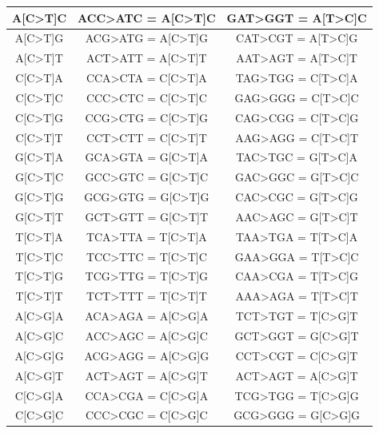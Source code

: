 \begin{longtable}{c|c|c}
\ttfamily A[C>T]C & \ttfamily ACC>ATC = A[C>T]C & \ttfamily GAT>GGT = A[T>C]C \\ \hline
\ttfamily A[C>T]G & \ttfamily ACG>ATG = A[C>T]G & \ttfamily CAT>CGT = A[T>C]G \\ \hline
\ttfamily A[C>T]T & \ttfamily ACT>ATT = A[C>T]T & \ttfamily AAT>AGT = A[T>C]T \\ \hline
\ttfamily C[C>T]A & \ttfamily CCA>CTA = C[C>T]A & \ttfamily TAG>TGG = C[T>C]A \\ \hline
\ttfamily C[C>T]C & \ttfamily CCC>CTC = C[C>T]C & \ttfamily GAG>GGG = C[T>C]C \\ \hline
\ttfamily C[C>T]G & \ttfamily CCG>CTG = C[C>T]G & \ttfamily CAG>CGG = C[T>C]G \\ \hline
\ttfamily C[C>T]T & \ttfamily CCT>CTT = C[C>T]T & \ttfamily AAG>AGG = C[T>C]T \\ \hline
\ttfamily G[C>T]A & \ttfamily GCA>GTA = G[C>T]A & \ttfamily TAC>TGC = G[T>C]A \\ \hline
\ttfamily G[C>T]C & \ttfamily GCC>GTC = G[C>T]C & \ttfamily GAC>GGC = G[T>C]C \\ \hline
\ttfamily G[C>T]G & \ttfamily GCG>GTG = G[C>T]G & \ttfamily CAC>CGC = G[T>C]G \\ \hline
\ttfamily G[C>T]T & \ttfamily GCT>GTT = G[C>T]T & \ttfamily AAC>AGC = G[T>C]T \\ \hline
\ttfamily T[C>T]A & \ttfamily TCA>TTA = T[C>T]A & \ttfamily TAA>TGA = T[T>C]A \\ \hline
\ttfamily T[C>T]C & \ttfamily TCC>TTC = T[C>T]C & \ttfamily GAA>GGA = T[T>C]C \\ \hline
\ttfamily T[C>T]G & \ttfamily TCG>TTG = T[C>T]G & \ttfamily CAA>CGA = T[T>C]G \\ \hline
\ttfamily T[C>T]T & \ttfamily TCT>TTT = T[C>T]T & \ttfamily AAA>AGA = T[T>C]T \\ \hline
\ttfamily A[C>G]A & \ttfamily ACA>AGA = A[C>G]A & \ttfamily TCT>TGT = T[C>G]T \\ \hline
\ttfamily A[C>G]C & \ttfamily ACC>AGC = A[C>G]C & \ttfamily GCT>GGT = G[C>G]T \\ \hline
\ttfamily A[C>G]G & \ttfamily ACG>AGG = A[C>G]G & \ttfamily CCT>CGT = C[C>G]T \\ \hline
\ttfamily A[C>G]T & \ttfamily ACT>AGT = A[C>G]T & \ttfamily ACT>AGT = A[C>G]T \\ \hline
\ttfamily C[C>G]A & \ttfamily CCA>CGA = C[C>G]A & \ttfamily TCG>TGG = T[C>G]G \\ \hline
\ttfamily C[C>G]C & \ttfamily CCC>CGC = C[C>G]C & \ttfamily GCG>GGG = G[C>G]G \\ \hline

\end{longtable}
